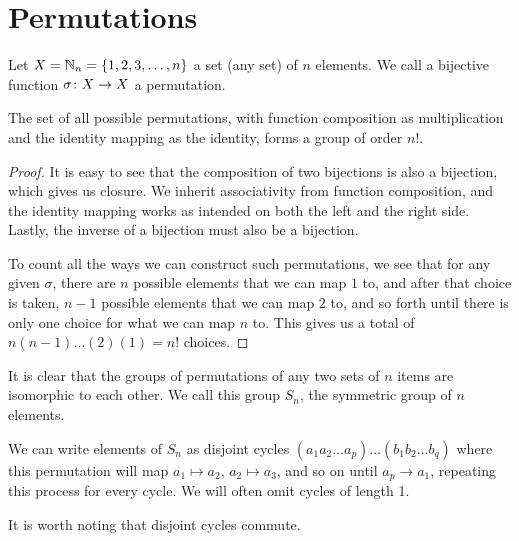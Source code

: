 \section{Permutations}

\begin{definition}
    Let \(X = \mathbb{N}_n = \{1,2,3,\hdots,n\}\)
    a set (any set) of \(n\) elements.
    We call a bijective function \(\sigma\colon X\to X\) a permutation.
\end{definition}
\begin{proposition}\label{prop:symmetric-group}
    The set of all possible permutations,
    with function composition as multiplication
    and the identity mapping as the identity,
    forms a group of order \(n!\).
\end{proposition}
\begin{proof}
    It is easy to see that the composition of two bijections
    is also a bijection,
    which gives us closure.
    We inherit associativity from function composition,
    and the identity mapping works as intended
    on both the left and the right side.
    Lastly, the inverse of a bijection
    must also be a bijection.

    To count all the ways we can construct such permutations,
    we see that for any given \(\sigma\),
    there are \(n\) possible elements that we can map \(1\) to,
    and after that choice is taken,
    \(n-1\) possible elements that we can map \(2\) to,
    and so forth until there is only one choice
    for what we can map \(n\) to.
    This gives us a total of \(n(n-1)\hdots(2)(1) = n!\) choices.
\end{proof}
\begin{definition}
    It is clear that the groups of permutations
    of any two sets of \(n\) items
    are isomorphic to each other.
    We call this group \(S_n\),
    the symmetric group of \(n\) elements.
\end{definition}

\begin{definition}
    We can write elements of \(S_n\) as disjoint cycles
    \((a_1 a_2 \hdots a_p) \hdots (b_1 b_2 \hdots b_q)\)
    where this permutation will map \(a_1 \mapsto a_2\),
    \(a_2 \mapsto a_3\), and so on until \(a_p \to a_1\),
    repeating this process for every cycle.
    We will often omit cycles of length 1.
\end{definition}
\begin{remark}
    It is worth noting that disjoint cycles commute.
\end{remark}

